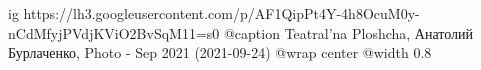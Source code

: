  
 
 
 
 

\ifcmt
  ig https://lh3.googleusercontent.com/p/AF1QipPt4Y-4h8OcuM0y-nCdMfyjPVdjKViO2BvSqM11=s0
	@caption Teatral'na Ploshcha, Анатолий Бурлаченко, Photo - Sep 2021 (2021-09-24)
  @wrap center
  @width 0.8
\fi

